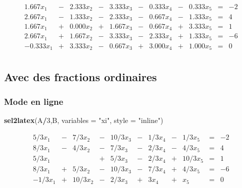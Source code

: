 \documentclass[]{article}
\newenvironment{Shaded}{\begin{snugshade}}{\end{snugshade}}
\newcommand{\DataTypeTok}[1]{\textcolor[rgb]{0.13,0.29,0.53}{#1}}
\newcommand{\DecValTok}[1]{\textcolor[rgb]{0.00,0.00,0.81}{#1}}
\newcommand{\KeywordTok}[1]{\textcolor[rgb]{0.13,0.29,0.53}{\textbf{#1}}}
\newcommand{\NormalTok}[1]{#1}
\newcommand{\OperatorTok}[1]{\textcolor[rgb]{0.81,0.36,0.00}{\textbf{#1}}}
\newcommand{\StringTok}[1]{\textcolor[rgb]{0.31,0.60,0.02}{#1}}
\begin{document}
\[
\begin{array}{rrrrrrrrrrr}
1.667 x_{1} & - & 2.333 x_{2} & - & 3.333 x_{3} & - & 0.333 x_{4} & - & 0.333 x_{5} & = & -2 \\ 
2.667 x_{1} & - & 1.333 x_{2} & - & 2.333 x_{3} & - & 0.667 x_{4} & - & 1.333 x_{5} & = & 4 \\ 
1.667 x_{1} & + & 0.000 x_{2} & + & 1.667 x_{3} & - & 0.667 x_{4} & + & 3.333 x_{5} & = & 1 \\ 
2.667 x_{1} & + & 1.667 x_{2} & - & 3.333 x_{3} & - & 2.333 x_{4} & + & 1.333 x_{5} & = & -6 \\ 
-0.333 x_{1} & + & 3.333 x_{2} & - & 0.667 x_{3} & + & 3.000 x_{4} & + & 1.000 x_{5} & = & 0 \\ 
\end{array}
\]

\hypertarget{avec-des-fractions-ordinaires}{%
\subsection{Avec des fractions
ordinaires}\label{avec-des-fractions-ordinaires}}

\hypertarget{mode-en-ligne}{%
\subsubsection{Mode en ligne}\label{mode-en-ligne}}

\begin{Shaded}
\begin{Highlighting}[]
\KeywordTok{sel2latex}\NormalTok{(A}\OperatorTok{/}\DecValTok{3}\NormalTok{,B, }\DataTypeTok{variables =} \StringTok{"xi"}\NormalTok{, }\DataTypeTok{style =} \StringTok{"inline"}\NormalTok{)}
\end{Highlighting}
\end{Shaded}

\[
\begin{array}{rrrrrrrrrrr}
5/3 x_{1} & - & 7/3 x_{2} & - & 10/3 x_{3} & - & 1/3 x_{4} & - & 1/3 x_{5} & = & -2 \\ 
8/3 x_{1} & - & 4/3 x_{2} & - & 7/3 x_{3} & - & 2/3 x_{4} & - & 4/3 x_{5} & = & 4 \\ 
5/3 x_{1} & & & + & 5/3 x_{3} & - & 2/3 x_{4} & + & 10/3 x_{5} & = & 1 \\ 
8/3 x_{1} & + & 5/3 x_{2} & - & 10/3 x_{3} & - & 7/3 x_{4} & + & 4/3 x_{5} & = & -6 \\ 
-1/3 x_{1} & + & 10/3 x_{2} & - & 2/3 x_{3} & + & 3 x_{4} & + & x_{5} & = & 0 \\ 
\end{array}
\]
\end{document}
